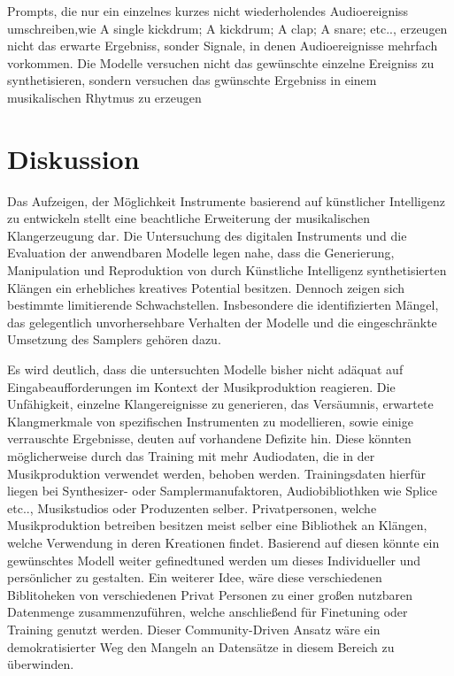 \documentclass[
  a4paper,  %
  twoside,  %
  bibliography=totoc,
  headsepline,
  cleardoublepage=empty,
  parskip=half,
  draft=false
]{scrbook}
\begin{document}
Prompts, die nur ein einzelnes kurzes nicht wiederholendes Audioereigniss umschreiben,wie \glqq A single kickdrum\grqq; 
\glqq A kickdrum\grqq; \glqq A clap\grqq; \glqq A snare\grqq; etc.., erzeugen nicht das erwarte Ergebniss, sonder Signale, in denen Audioereignisse mehrfach vorkommen. Die Modelle versuchen nicht das gewünschte einzelne Ereigniss zu synthetisieren, sondern versuchen das gwünschte Ergebniss in einem musikalischen Rhytmus zu erzeugen 

\chapter{Diskussion}

Das Aufzeigen, der Möglichkeit Instrumente basierend auf künstlicher Intelligenz zu entwickeln stellt eine beachtliche Erweiterung der musikalischen Klangerzeugung dar. Die Untersuchung des digitalen Instruments und die Evaluation der anwendbaren Modelle legen nahe, dass die Generierung, Manipulation und Reproduktion von durch Künstliche Intelligenz synthetisierten Klängen ein erhebliches kreatives Potential besitzen. Dennoch zeigen sich bestimmte limitierende Schwachstellen. Insbesondere die identifizierten Mängel, das gelegentlich unvorhersehbare Verhalten der Modelle und die eingeschränkte Umsetzung des Samplers gehören dazu.

Es wird deutlich, dass die untersuchten Modelle bisher nicht adäquat auf Eingabeaufforderungen im Kontext der Musikproduktion reagieren. Die Unfähigkeit, einzelne Klangereignisse zu generieren, das Versäumnis, erwartete Klangmerkmale von spezifischen Instrumenten zu modellieren, sowie einige verrauschte Ergebnisse, deuten auf vorhandene Defizite hin. Diese könnten möglicherweise durch das Training mit mehr Audiodaten, die in der Musikproduktion verwendet werden, behoben werden. Trainingsdaten hierfür liegen bei Synthesizer- oder Samplermanufaktoren, Audiobibliothken wie Splice etc.., Musikstudios oder Produzenten selber. Privatpersonen, welche Musikproduktion betreiben besitzen meist selber eine Bibliothek an Klängen, welche Verwendung in deren Kreationen findet. Basierend auf diesen könnte ein gewünschtes Modell weiter gefinedtuned werden um dieses Individueller und persönlicher zu gestalten. Ein weiterer Idee, wäre diese verschiedenen Biblitoheken von verschiedenen Privat Personen zu einer großen nutzbaren Datenmenge zusammenzuführen, welche anschließend für Finetuning oder Training genutzt werden. Dieser Community-Driven Ansatz wäre ein demokratisierter Weg den Mangeln an Datensätze in diesem Bereich zu überwinden. 
\end{document}
